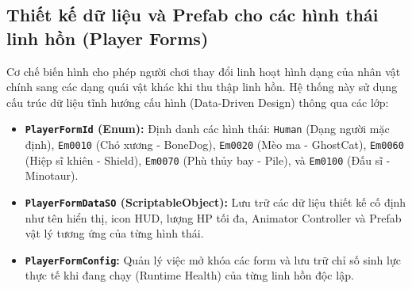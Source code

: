 \documentclass[../DoAn.tex]{subfiles}
\begin{document}
\subsection{Thiết kế dữ liệu và Prefab cho các hình thái linh hồn (Player Forms)}
Cơ chế biến hình cho phép người chơi thay đổi linh hoạt hình dạng của nhân vật chính sang các dạng quái vật khác khi thu thập linh hồn. Hệ thống này sử dụng cấu trúc dữ liệu tĩnh hướng cấu hình (Data-Driven Design) thông qua các lớp:
\begin{itemize}
    \item \textbf{\texttt{PlayerFormId} (Enum):} Định danh các hình thái: \texttt{Human} (Dạng người mặc định), \texttt{Em0010} (Chó xương - BoneDog), \texttt{Em0020} (Mèo ma - GhostCat), \texttt{Em0060} (Hiệp sĩ khiên - Shield), \texttt{Em0070} (Phù thủy bay - Pile), và \texttt{Em0100} (Đấu sĩ - Minotaur).
    \item \textbf{\texttt{PlayerFormDataSO} (ScriptableObject):} Lưu trữ các dữ liệu thiết kế cố định như tên hiển thị, icon HUD, lượng HP tối đa, Animator Controller và Prefab vật lý tương ứng của từng hình thái.
    \item \textbf{\texttt{PlayerFormConfig}:} Quản lý việc mở khóa các form và lưu trữ chỉ số sinh lực thực tế khi đang chạy (Runtime Health) của từng linh hồn độc lập.
\end{itemize}
\end{document}
